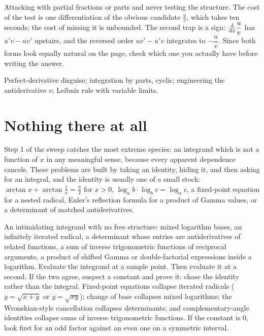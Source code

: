 \begin{trap}
Attacking with partial fractions or parts and never testing the structure. The cost of the test is one differentiation of the obvious candidate $\tfrac{u}{v}$, which takes ten seconds; the cost of missing it is unbounded. The second trap is a sign: $\frac{\mathrm{d}}{\mathrm{d}x}\dfrac uv$ has $u'v-uv'$ upstairs, and the reversed order $uv'-u'v$ integrates to $-\dfrac uv$. Since both forms look equally natural on the page, check which one you actually have before writing the answer.
\end{trap}

\begin{seealsob}Perfect-derivative disguise; integration by parts, cyclic; engineering the antiderivative $v$; Leibniz rule with variable limits.\end{seealsob}

\section{Nothing there at all}

Step 1 of the sweep catches the most extreme species: an integrand which is not a function of $x$ in any meaningful sense, because every apparent dependence cancels. These problems are built by taking an identity, hiding it, and then asking for an integral, and the identity is usually one of a small stock: $\arctan x+\arctan\tfrac1x=\tfrac{\pi}{2}$ for $x>0$, $\log_ab\cdot\log_bc=\log_ac$, a fixed-point equation for a nested radical, Euler's reflection formula for a product of Gamma values, or a determinant of matched antiderivatives.

\cue An intimidating integrand with no free structure: mixed logarithm bases, an infinitely iterated radical, a determinant whose entries are antiderivatives of related functions, a sum of inverse trigonometric functions of reciprocal arguments, a product of shifted Gamma or double-factorial expressions inside a logarithm.
\method Evaluate the integrand at a sample point. Then evaluate it at a second. If the two agree, suspect a constant and prove it: chase the identity rather than the integral. Fixed-point equations collapse iterated radicals ($y=\sqrt{x+y}$ or $y=\sqrt{xy}$); change of base collapses mixed logarithms; the Wronskian-style cancellation collapses determinants; and complementary-angle identities collapse sums of inverse trigonometric functions. If the constant is $0$, look first for an odd factor against an even one on a symmetric interval.

